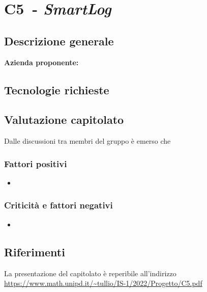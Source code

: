 
\renewcommand{\capName}{\textit{SmartLog}} %
\renewcommand{\capCode}{C5} %
\renewcommand{\capLink}{https://www.math.unipd.it/~tullio/IS-1/2022/Progetto/C5.pdf} %
\renewcommand{\capProposer}{Socomec} %


\section{\capCode\ - \capName} 
\subsection{Descrizione generale}
\textbf{Azienda proponente:}


\subsection{Tecnologie richieste}

\subsection{Valutazione capitolato}
Dalle discussioni tra membri del gruppo è emerso che

\subsubsection{Fattori positivi}

\begin{itemize}
    \item 
\end{itemize}

\subsubsection{Criticità e fattori negativi}

\begin{itemize}
    \item 
\end{itemize}

\subsection{Riferimenti}
La presentazione del capitolato è reperibile all'indirizzo \url{\capLink}